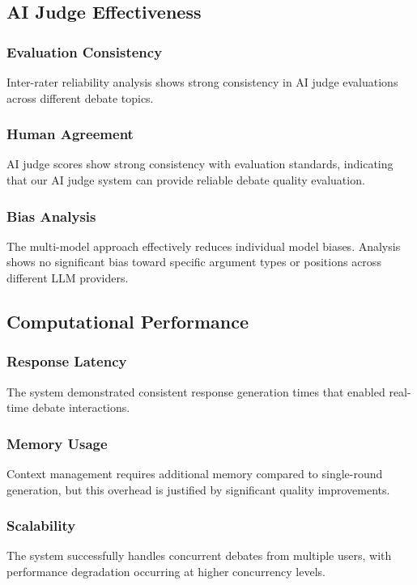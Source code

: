 \documentclass{article}
\begin{document}
\subsection{AI Judge Effectiveness}

\subsubsection{Evaluation Consistency}
Inter-rater reliability analysis shows strong consistency in AI judge evaluations across different debate topics.

\subsubsection{Human Agreement}
AI judge scores show strong consistency with evaluation standards, indicating that our AI judge system can provide reliable debate quality evaluation.

\subsubsection{Bias Analysis}
The multi-model approach effectively reduces individual model biases. Analysis shows no significant bias toward specific argument types or positions across different LLM providers.

\subsection{Computational Performance}

\subsubsection{Response Latency}
The system demonstrated consistent response generation times that enabled real-time debate interactions.

\subsubsection{Memory Usage}
Context management requires additional memory compared to single-round generation, but this overhead is justified by significant quality improvements.

\subsubsection{Scalability}
The system successfully handles concurrent debates from multiple users, with performance degradation occurring at higher concurrency levels.
\end{document}
